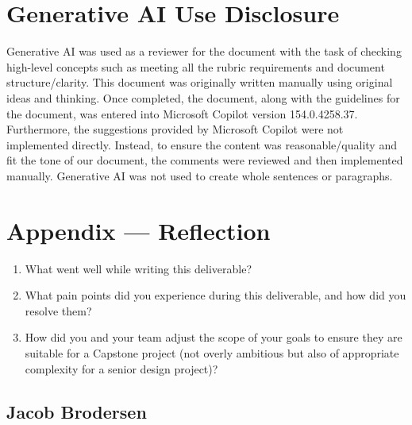 \documentclass{article}
\begin{document}
\section{Generative AI Use Disclosure}

Generative AI was used as a reviewer for the document with the task of checking high-level concepts such as meeting all the rubric requirements and document structure/clarity. This document was originally written manually using original ideas and thinking. Once completed, the document, along with the guidelines for the document, was entered into Microsoft Copilot version 154.0.4258.37. Furthermore, the suggestions provided by Microsoft Copilot were not implemented directly. Instead, to ensure the content was reasonable/quality and fit the tone of our document, the comments were reviewed and then implemented manually. Generative AI was not used to create whole sentences or paragraphs.

\newpage{}

\section*{Appendix --- Reflection}



\begin{enumerate}
    \item What went well while writing this deliverable? 
    \item What pain points did you experience during this deliverable, and how
    did you resolve them?
    \item How did you and your team adjust the scope of your goals to ensure
    they are suitable for a Capstone project (not overly ambitious but also of
    appropriate complexity for a senior design project)?
\end{enumerate}  

\subsection*{Jacob Brodersen}
\end{document}
